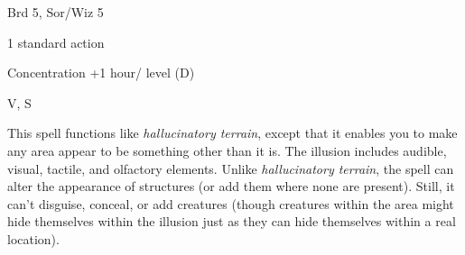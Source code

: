 
\begin{description*}
\item[Level:] Brd 5, Sor/Wiz 5
\item[Casting Time:] 1 standard action
\item[Duration:] Concentration +1 hour/ level (D)
\item[Components:] V, S
\end{description*}

This spell functions like \textit{hallucinatory terrain}, except that it enables
you to make any area appear to be something other than it is. The illusion includes
audible, visual, tactile, and olfactory elements. Unlike \textit{hallucinatory
terrain}, the spell can alter the appearance of structures (or add them where none
are present). Still, it can't disguise, conceal, or add creatures (though creatures
within the area might hide themselves within the illusion just as they can hide
themselves within a real location).